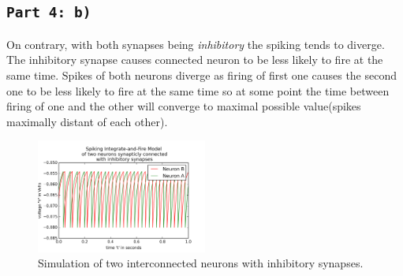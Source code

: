 \documentclass[12pt,a4paper,twocolumn]{article}
\begin{document}
\subsection*{\texttt{Part 4: b)}}
On contrary, with both synapses being \emph{inhibitory} the spiking tends to diverge. The inhibitory synapse causes connected neuron to be less likely to fire at the same time. Spikes of both neurons diverge as firing of first one causes the second one to be less likely to fire at the same time so at some point the time between firing of one and the other will converge to maximal possible value(spikes maximally distant of each other).

\begin{figure}[htbp]
\centering
\includegraphics[width=0.5\textwidth]{figures/figure4b.png}
\caption{Simulation of two interconnected neurons with inhibitory synapses.\label{fig:part4b}}
\vspace{0.4cm}
\end{figure}
\end{document}
